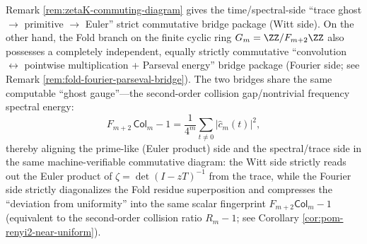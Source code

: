 \begin{remark}\label{rem:fw-bridge}
Remark \ref{rem:zetaK-commuting-diagram} gives the time/spectral-side ``trace ghost \(\to\) primitive \(\to\) Euler'' strict commutative bridge package (Witt side).
On the other hand, the Fold branch on the finite cyclic ring \(G_m=\ZZ/F_{m+2}\ZZ\) also possesses a completely independent, equally strictly commutative ``convolution \(\leftrightarrow\) pointwise multiplication + Parseval energy'' bridge package (Fourier side; see Remark \ref{rem:fold-fourier-parseval-bridge}).
The two bridges share the same computable ``ghost gauge''---the second-order collision gap/nontrivial frequency spectral energy:
\[
F_{m+2}\,\mathsf{Col}_m-1=\frac{1}{4^m}\sum_{t\ne 0}\bigl|\widehat c_m(t)\bigr|^2,
\]
thereby aligning the prime-like (Euler product) side and the spectral/trace side in the same machine-verifiable commutative diagram: the Witt side strictly reads out the Euler product of \(\zeta=\det(I-zT)^{-1}\) from the trace, while the Fourier side strictly diagonalizes the Fold residue superposition and compresses the ``deviation from uniformity'' into the same scalar fingerprint \(F_{m+2}\mathsf{Col}_m-1\) (equivalent to the second-order collision ratio \(R_m-1\); see Corollary \ref{cor:pom-renyi2-near-uniform}).
\end{remark}

